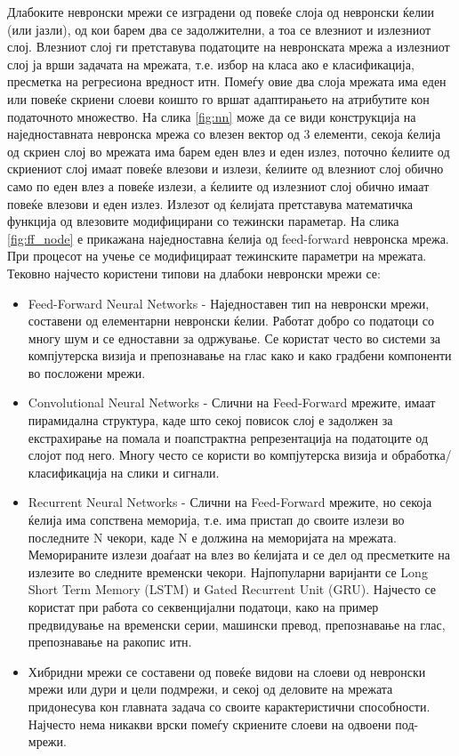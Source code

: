 Длабоките невронски мрежи се изградени од повеќе слоја од невронски ќелии (или јазли), од кои барем два се задолжителни, а тоа се влезниот и излезниот слој. Влезниот слој ги претставува податоците на невронската мрежа а излезниот слој ја врши задачата на мрежата, т.е. избор на класа ако е класификација, пресметка на регресиона вредност итн. Помеѓу овие два слоја мрежата има еден или повеќе скриени слоеви коишто го вршат адаптирањето на атрибутите кон податочното множество. На слика \ref{fig:nn} може да се види конструкција на наједноставната невронска мрежа со влезен вектор од 3 елементи, секоја ќелија од скриен слој во мрежата има барем еден влез и еден излез, поточно ќелиите од скриениот слој имаат повеќе влезови и излези, ќелиите од влезниот слој обично само по еден влез а повеќе излези, а ќелиите од излезниот слој обично имаат повеќе влезови и еден излез. Излезот од ќелијата претставува математичка функција од влезовите модифицирани со тежински параметар. На слика \ref{fig:ff_node} е прикажана наједноставна ќелија од feed-forward невронска мрежа. При процесот на учење се модифицираат тежинските параметри на мрежата.
Тековно најчесто користени типови на длабоки невронски мрежи се:
\begin{itemize}
    \item Feed-Forward Neural Networks - Наједноставен тип на невронски мрежи, составени од елементарни невронски ќелии. Работат добро со податоци со многу шум и се едноставни за одржување. Се користат често во системи за компјутерска визија и препознавање на глас како и како градбени компоненти во посложени мрежи.
    \item Convolutional Neural Networks - Слични на Feed-Forward мрежите, имаат пирамидална структура, каде што секој повисок слој е задолжен за екстрахирање на помала и поапстрактна репрезентација на податоците од слојот под него. Многу често се користи во компјутерска визија и обработка/класификација на слики и сигнали.
    \item Recurrent Neural Networks - Слични на Feed-Forward мрежите, но секоја ќелија има сопствена меморија, т.е. има пристап до своите излези во последните N чекори, каде N е должина на меморијата на мрежата. Меморираните излези доаѓаат на влез во ќелијата и се дел од пресметките на излезите во следните временски чекори. Најпопуларни варијанти се Long Short Term Memory (LSTM) и Gated Recurrent Unit (GRU). Најчесто се користат при работа со секвенцијални податоци, како на пример предвидување на временски серии, машински превод, препознавање на глас, препознавање на ракопис итн.
    \item Хибридни мрежи се составени од повеќе видови на слоеви од невронски мрежи или дури и цели подмрежи, и секој од деловите на мрежата придонесува кон главната задача со своите карактеристични способности. Најчесто нема никакви врски помеѓу скриените слоеви на одвоени под-мрежи.
\end{itemize}

